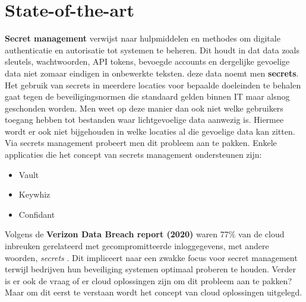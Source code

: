 

\section{State-of-the-art}
\label{sec:state-of-the-art}
\textbf{Secret management} verwijst naar hulpmiddelen en methodes om digitale authenticatie en autorisatie tot systemen te beheren. Dit houdt in dat data zoals sleutels, wachtwoorden, API tokens, bevoegde accounts en dergelijke gevoelige data niet zomaar eindigen in onbewerkte teksten. deze data noemt men \textbf{secrets}. Het gebruik van secrets in meerdere locaties voor bepaalde doeleinden te behalen gaat tegen de beveiligingsnormen die standaard gelden binnen IT maar alsnog geschonden worden. Men weet op deze manier dan ook niet welke gebruikers toegang hebben tot bestanden waar lichtgevoelige data aanwezig is. Hiermee wordt er ook niet bijgehouden in welke locaties al die gevoelige data kan zitten. Via secrets management probeert men dit probleem aan te pakken. Enkele applicaties die het concept van secrets management ondersteunen zijn:

\begin{itemize}
    \item Vault
    \item Keywhiz
    \item Confidant
\end{itemize}

Volgens de \textbf{Verizon Data Breach report (2020)} waren 77\% van de cloud inbreuken gerelateerd met gecompromitteerde inloggegevens, met andere woorden, \textit{secrets} \autocite{Hoffman2021}. Dit impliceert naar een zwakke focus voor secret management terwijl bedrijven hun beveiliging systemen optimaal proberen te houden. Verder is er ook de vraag of er cloud oplossingen zijn om dit probleem aan te pakken? Maar om dit eerst te verstaan wordt het concept van cloud oplossingen uitgelegd. 


